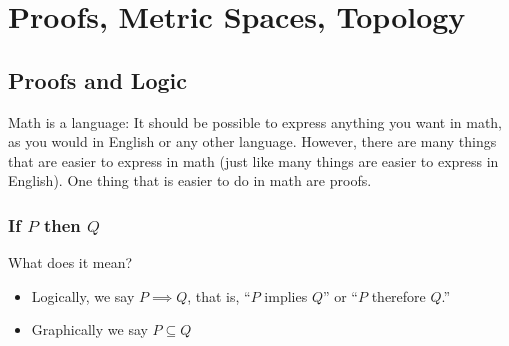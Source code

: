 \documentclass{article}
\begin{document}
\displayoptions

\section{Proofs, Metric Spaces, Topology}
\label{sec:proofs_metric_spaces_topology}

\localtableofcontents

\subsection{Proofs and Logic}
\label{sub:proofs_and_logic}

Math is a language: It should be possible to express anything you want in math, as you would in English or any other language. However, there are many things that are easier to express in math (just like many things are easier to express in English). One thing that is easier to do in math are proofs.

\subsubsection{If $P$ then $Q$}
\label{ssub:if_p_then_q}

What does it mean?
\begin{itemize}[label=$\bullet$]
  \item Logically, we say $P \implies Q$, that is, ``$P$ implies $Q$'' or ``$P$ therefore $Q$.''
    \begin{figure}[H]
      \centering
    \end{figure}

  \item Graphically we say $P \subseteq Q$
    \begin{figure}[H]
      \centering
    \end{figure}
\end{itemize}
\end{document}
